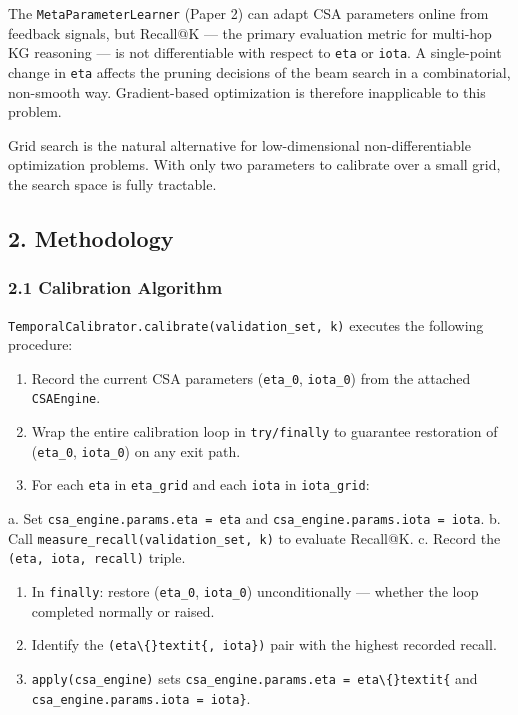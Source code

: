 The \texttt{MetaParameterLearner} (Paper 2) can adapt CSA parameters online from feedback signals, but Recall@K --- the primary evaluation metric for multi-hop KG reasoning --- is not differentiable with respect to \texttt{eta} or \texttt{iota}. A single-point change in \texttt{eta} affects the pruning decisions of the beam search in a combinatorial, non-smooth way. Gradient-based optimization is therefore inapplicable to this problem.

Grid search is the natural alternative for low-dimensional non-differentiable optimization problems. With only two parameters to calibrate over a small grid, the search space is fully tractable.

\subsection*{2. Methodology}

\subsubsection*{2.1 Calibration Algorithm}
\texttt{TemporalCalibrator.calibrate(validation\_set, k)} executes the following procedure:

\begin{enumerate}
  \item Record the current CSA parameters (\texttt{eta\_0}, \texttt{iota\_0}) from the attached \texttt{CSAEngine}.
  \item Wrap the entire calibration loop in \texttt{try/finally} to guarantee restoration of (\texttt{eta\_0}, \texttt{iota\_0}) on any exit path.
  \item For each \texttt{eta} in \texttt{eta\_grid} and each \texttt{iota} in \texttt{iota\_grid}:
\end{enumerate}

a. Set \texttt{csa\_engine.params.eta = eta} and \texttt{csa\_engine.params.iota = iota}.
b. Call \texttt{measure\_recall(validation\_set, k)} to evaluate Recall@K.
c. Record the \texttt{(eta, iota, recall)} triple.
\begin{enumerate}
  \item In \texttt{finally}: restore (\texttt{eta\_0}, \texttt{iota\_0}) unconditionally --- whether the loop completed normally or raised.
  \item Identify the \texttt{(eta\textbackslash\{\}textit\{, iota\})} pair with the highest recorded recall.
  \item \texttt{apply(csa\_engine)} sets \texttt{csa\_engine.params.eta = eta\textbackslash\{\}textit\{} and \texttt{csa\_engine.params.iota = iota\}}.
\end{enumerate}


